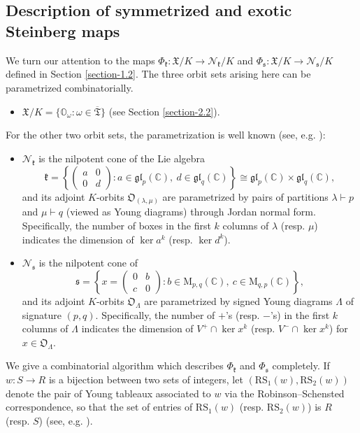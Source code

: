 \documentclass[11pt]{article}
\theoremstyle{definition}
\numberwithin{equation}{section}
\newcommand{\fk}{\mathfrak{k}}
\newcommand{\fs}{\mathfrak{s}}
\newcommand{\gl}{\mathfrak{gl}}
\newcommand{\RS}{\mathrm{RS}}
\newcommand{\Mat}{\mathrm{M}}
\newcommand{\Xorbit}{\mathbb{O}}
\newcommand{\Nkorbit}{\mathfrak{O}}
\newcommand{\Nsorbit}{\mathfrak{O}}
\newcommand{\nilpotentsof}[1]{\mathcal{N}_{#1}}
\newcommand{\ppermutationsof}{\mathfrak{T}}
\newcommand{\parameters}{\overline{\ppermutationsof}}
\newcommand{\Xfv}{\mathfrak{X}}
\newcommand{\mC}{\mathbb{C}}
\begin{document}
\subsection{Description of symmetrized and exotic Steinberg maps}

\label{section-2.3}


We turn our attention to the maps $\Phi_\fk:\Xfv/K\to \nilpotentsof{\fk}/K$ and $\Phi_\fs:\Xfv/K\to\nilpotentsof{\fs}/K$ defined in Section \ref{section-1.2}.
The three orbit sets arising here can be parametrized combinatorially.
\begin{itemize}
\item $\Xfv/K=\{\Xorbit_\omega:\omega\in\parameters\}$ (see Section \ref{section-2.2}).
\end{itemize}
For the other two orbit sets, the parametrization is well known (see, e.g. \cite{Collingwood-McGovern}):
\begin{itemize}
\item $\nilpotentsof{\fk}$ is the nilpotent cone of the Lie algebra
$$\fk=\left\{\begin{pmatrix} a & 0\\ 0 &
d\end{pmatrix}:a\in\gl_p(\mC),\
d\in\gl_q(\mC)\right\}\cong\gl_p(\mC)\times\gl_q(\mC),$$
and its adjoint
$K$-orbits $\Nkorbit_{(\lambda,\mu)}$ are parametrized by pairs of
partitions $\lambda\vdash p$ and $\mu\vdash q$ (viewed as Young
diagrams) through Jordan normal form. Specifically, the number of
boxes in the first $k$ columns of $\lambda$ (resp. $\mu$) indicates
the dimension of $\ker a^k$ (resp. $\ker d^k$).
\item $\nilpotentsof{\fs}$ is the nilpotent cone of
$$\fs=\left\{x=\begin{pmatrix} 0 & b\\ c &
0\end{pmatrix}:b\in\Mat_{p,q}(\mC),\ c\in\Mat_{q,p}(\mC)\right\},$$
and
its adjoint $K$-orbits $\Nsorbit_{\Lambda}$ are parametrized by
signed Young diagrams $\Lambda$ of signature $(p,q)$. Specifically,
the number of $+$'s (resp. $-$'s) in the first $k$ columns of
$\Lambda$ indicates the dimension of $V^+\cap\ker x^k$ (resp.
$V^-\cap\ker x^k$) for $x\in\Nsorbit_\Lambda$.

\end{itemize}

We give a combinatorial algorithm which describes $\Phi_\fk$ and $\Phi_\fs$ completely. If $w:S\to R$ is a bijection
between two sets of integers, let $(\RS_1(w),\RS_2(w))$ denote the
pair of Young tableaux associated to $w$ via the Robinson--Schensted
correspondence, so that the set of entries of $\RS_1(w)$ (resp.
$\RS_2(w)$) is $R$ (resp. $S$) (see, e.g. \cite{Fulton}).
\end{document}
